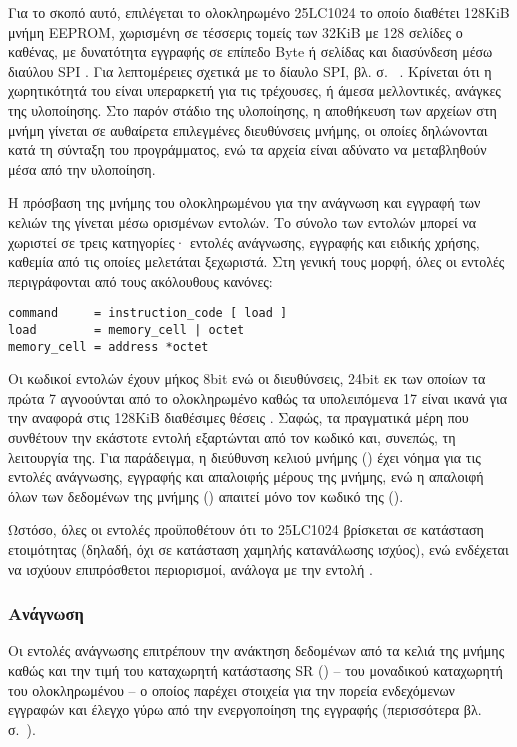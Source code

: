 Για το σκοπό αυτό, επιλέγεται το ολοκληρωμένο 25LC1024 το οποίο διαθέτει 128KiB
μνήμη EEPROM, χωρισμένη σε τέσσερις τομείς των 32KiB με 128 σελίδες ο καθένας,
με δυνατότητα εγγραφής σε επίπεδο Byte ή σελίδας και διασύνδεση μέσω διαύλου SPI
\parencite[1]{25lc1024}. Για λεπτομέρειες σχετικά με το δίαυλο SPI, βλ. σ.~%
\pageref{subsec:spi}. Κρίνεται ότι η χωρητικότητά του είναι υπεραρκετή για τις
τρέχουσες, ή άμεσα μελλοντικές, ανάγκες της υλοποίησης.
Στο παρόν στάδιο της υλοποίησης, η αποθήκευση των αρχείων στη μνήμη γίνεται σε
αυθαίρετα επιλεγμένες διευθύνσεις μνήμης, οι οποίες δηλώνονται κατά τη σύνταξη
του προγράμματος, ενώ τα αρχεία είναι αδύνατο να μεταβληθούν μέσα από την
υλοποίηση.

Η πρόσβαση της μνήμης του ολοκληρωμένου για την ανάγνωση και εγγραφή των κελιών
της γίνεται μέσω ορισμένων εντολών. Το σύνολο των εντολών μπορεί να χωριστεί σε
τρεις κατηγορίες· εντολές ανάγνωσης, εγγραφής και ειδικής χρήσης, καθεμία από
τις οποίες μελετάται ξεχωριστά. Στη γενική τους μορφή, όλες οι εντολές
περιγράφονται από τους ακόλουθους κανόνες:
\begin{lstlisting}
command     = instruction_code [ load ]
load        = memory_cell | octet
memory_cell = address *octet
\end{lstlisting}
Οι κωδικοί εντολών έχουν μήκος 8bit ενώ οι διευθύνσεις, 24bit εκ των οποίων τα
πρώτα 7 αγνοούνται από το ολοκληρωμένο καθώς τα υπολειπόμενα 17 είναι ικανά για
την αναφορά στις 128KiB διαθέσιμες θέσεις \parencite[6--7]{25lc1024}. Σαφώς,
τα πραγματικά μέρη που συνθέτουν την εκάστοτε εντολή εξαρτώνται από τον κωδικό
και, συνεπώς, τη λειτουργία της. Για παράδειγμα, η διεύθυνση κελιού μνήμης
() έχει νόημα για τις εντολές ανάγνωσης, εγγραφής και
απαλοιφής μέρους της μνήμης, ενώ η απαλοιφή όλων των δεδομένων της μνήμης
() απαιτεί μόνο τον κωδικό της ().

Ωστόσο, όλες οι εντολές προϋποθέτουν ότι το 25LC1024 βρίσκεται σε κατάσταση
ετοιμότητας (δηλαδή, όχι σε κατάσταση χαμηλής κατανάλωσης ισχύος), ενώ ενδέχεται
να ισχύουν επιπρόσθετοι περιορισμοί, ανάλογα με την εντολή
\parencite[17]{25lc1024}.


\subsubsection{Ανάγνωση}
\label{ssubsec:25lc1024:read-commands}

Οι εντολές ανάγνωσης επιτρέπουν την ανάκτηση δεδομένων από τα κελιά της μνήμης
καθώς και την τιμή του καταχωρητή κατάστασης SR () -- του
μοναδικού καταχωρητή του ολοκληρωμένου -- ο οποίος παρέχει στοιχεία για την
πορεία ενδεχόμενων εγγραφών και έλεγχο γύρω από την ενεργοποίηση της εγγραφής
(περισσότερα βλ. 
σ.~\pageref{ssubsec:25lc1024:write-protect}).

